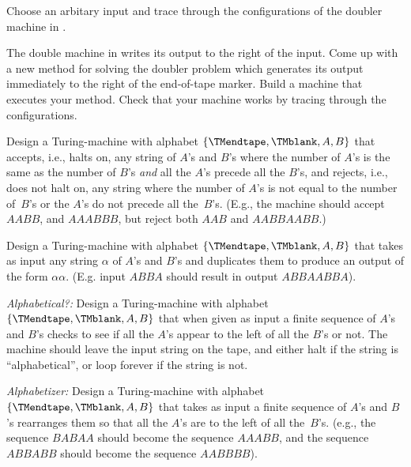 \documentclass[../../../include/open-logic-section]{subfiles}
\begin{document}
\begin{prob}
Choose an arbitary input and trace through the configurations of the
doubler machine in .
\end{prob}

\begin{prob}
The double machine in  writes its
output to the right of the input.  Come up with a new method for
solving the doubler problem which generates its output immediately to
the right of the end-of-tape marker. Build a machine that executes
your method. Check that your machine works by tracing through the
configurations.
\end{prob}

\begin{prob}
Design a Turing-machine with alphabet $\{\TMendtape,\TMblank, A, B\}$
that accepts, i.e., halts on, any string of $A$'s and $B$'s where the
number of $A$'s is the same as the number of $B$'s \emph{and} all the
$A$'s precede all the $B$'s, and rejects, i.e., does not halt on, any
string where the number of $A$'s is not equal to the number of~$B$'s or
the $A$'s do not precede all the~$B$'s. (E.g., the machine should accept
$AABB$, and $AAABBB$, but reject both $AAB$ and $AABBAABB$.)
\end{prob}

\begin{prob}
Design a Turing-machine with alphabet $\{\TMendtape,\TMblank, A, B\}$
that takes as input any string $\alpha$ of $A$'s and $B$'s and
duplicates them to produce an output of the form $\alpha\alpha$. (E.g.
input $ABBA$ should result in output $ABBAABBA$).
\end{prob}

\begin{prob}
\emph{Alphabetical?:} Design a Turing-machine with alphabet
$\{\TMendtape,\TMblank, A, B\}$ that when given as input a finite
sequence of $A$'s and $B$'s checks to see if all the $A$'s appear to
the left of all the $B$'s or not. The machine should leave the input
string on the tape, and either halt if the string is
``alphabetical'', or loop forever if the string is not.
\end{prob}

\begin{prob}
\emph{Alphabetizer:} Design a Turing-machine with alphabet
$\{\TMendtape,\TMblank, A, B\}$ that takes as input a finite sequence
of $A$'s and $B$'s rearranges them so that all the $A$'s are to the
left of all the~$B$'s. (e.g., the sequence $BABAA$ should become the
sequence $AAABB$, and the sequence $ABBABB$ should become the sequence
$AABBBB$).
\end{prob}
\end{document}
